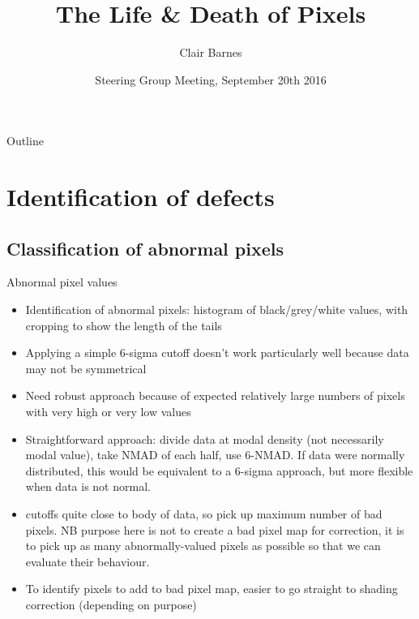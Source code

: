 \documentclass{beamer}
\title{The Life \& Death of Pixels}
\author{Clair Barnes}
\institute[University of Warwick] %
{
  Department of Statistics \& WMG\\
  University of Warwick
}
\date{Steering Group Meeting, September 20th 2016}
\begin{document}
\begin{frame}
  \titlepage
\end{frame}

\begin{frame}{Outline}
  \tableofcontents
\end{frame}


\section{Identification of defects}

\subsection{Classification of abnormal pixels}

\begin{frame}{Abnormal pixel values}%
  \begin{itemize}
  \item Identification of abnormal pixels: histogram of black/grey/white values, with cropping to show the length of the tails
  \item Applying a simple 6-sigma cutoff doesn't work particularly well because data may not be symmetrical
  \item Need robust approach because of expected relatively large numbers of pixels with very high or very low values
  \item Straightforward approach: divide data at modal density (not necessarily modal value), take NMAD of each half, use 6-NMAD. If data were normally distributed, this would be equivalent to a 6-sigma approach, but more flexible when data is not normal.
  \item cutoffs quite close to body of data, so pick up maximum number of bad pixels. NB purpose here is not to create a bad pixel map for correction, it is to pick up as many abnormally-valued pixels as possible so that we can evaluate their behaviour.
  \item To identify pixels to add to bad pixel map, easier to go straight to shading correction (depending on purpose)
  \end{itemize}
\end{frame}
\end{document}
